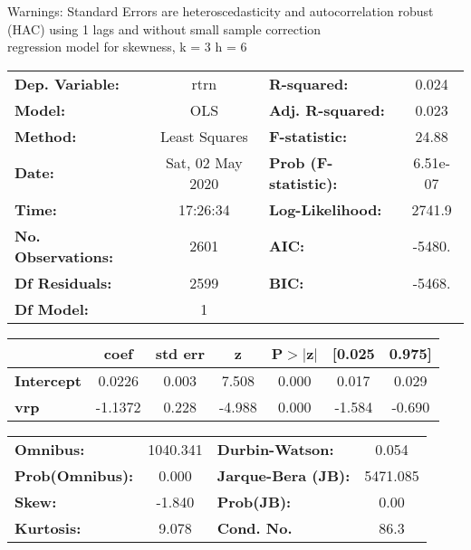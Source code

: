 Warnings: \newline
 [1] Standard Errors are heteroscedasticity and autocorrelation robust (HAC) using 1 lags and without small sample correction\\ 

regression model for skewness, k = 3 h = 6\begin{center}
\begin{tabular}{lclc}
\toprule
\textbf{Dep. Variable:}    &       rtrn       & \textbf{  R-squared:         } &     0.024   \\
\textbf{Model:}            &       OLS        & \textbf{  Adj. R-squared:    } &     0.023   \\
\textbf{Method:}           &  Least Squares   & \textbf{  F-statistic:       } &     24.88   \\
\textbf{Date:}             & Sat, 02 May 2020 & \textbf{  Prob (F-statistic):} &  6.51e-07   \\
\textbf{Time:}             &     17:26:34     & \textbf{  Log-Likelihood:    } &    2741.9   \\
\textbf{No. Observations:} &        2601      & \textbf{  AIC:               } &    -5480.   \\
\textbf{Df Residuals:}     &        2599      & \textbf{  BIC:               } &    -5468.   \\
\textbf{Df Model:}         &           1      & \textbf{                     } &             \\
\bottomrule
\end{tabular}
\begin{tabular}{lcccccc}
                   & \textbf{coef} & \textbf{std err} & \textbf{z} & \textbf{P$> |$z$|$} & \textbf{[0.025} & \textbf{0.975]}  \\
\midrule
\textbf{Intercept} &       0.0226  &        0.003     &     7.508  &         0.000        &        0.017    &        0.029     \\
\textbf{vrp}       &      -1.1372  &        0.228     &    -4.988  &         0.000        &       -1.584    &       -0.690     \\
\bottomrule
\end{tabular}
\begin{tabular}{lclc}
\textbf{Omnibus:}       & 1040.341 & \textbf{  Durbin-Watson:     } &    0.054  \\
\textbf{Prob(Omnibus):} &   0.000  & \textbf{  Jarque-Bera (JB):  } & 5471.085  \\
\textbf{Skew:}          &  -1.840  & \textbf{  Prob(JB):          } &     0.00  \\
\textbf{Kurtosis:}      &   9.078  & \textbf{  Cond. No.          } &     86.3  \\
\bottomrule
\end{tabular}
\end{center}

